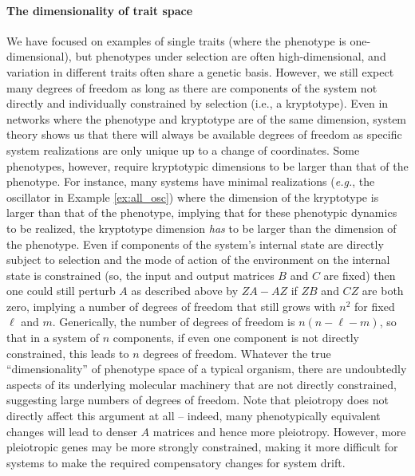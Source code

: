 \documentclass{article}
\newcommand{\1}{\mathbbm{1}}
\begin{document}
\paragraph{The dimensionality of trait space} 
We have focused on examples of single traits (where the phenotype is one-dimensional),
but phenotypes under selection are often high-dimensional,
and variation in different traits often share a genetic basis.
However, we still expect many degrees of freedom
as long as there are components of the system not directly and individually constrained by selection
(i.e., a kryptotype). %
Even in networks where the phenotype and kryptotype are of the same dimension,
system theory shows us that there will always be available degrees of freedom
as specific system realizations are only unique up to a change of coordinates.
Some phenotypes, however, require kryptotypic dimensions to be larger than that of the phenotype.
For instance, many systems have minimal realizations (\emph{e.g.}, the oscillator in Example \ref{ex:all_osc}) where the dimension of the kryptotype is larger
than that of the phenotype, implying that for these phenotypic dynamics to be realized, the kryptotype dimension \emph{has} to be larger than the dimension of the phenotype.
Even if components of the system's internal state are directly subject to selection
and the mode of action of the environment on the internal state is constrained
(so, the input and output matrices $B$ and $C$ are fixed)
then one could still perturb $A$ as described above by $ZA - AZ$
if $ZB$ and $CZ$ are both zero, implying a number of degrees of freedom that still grows with $n^2$
for fixed $\ell$ and $m$.
Generically, the number of degrees of freedom is $n(n - \ell - m)$,
so that in a system of $n$ components, if even one component is not directly constrained,
this leads to $n$ degrees of freedom.
Whatever the true ``dimensionality'' of phenotype space of a typical organism,
there are undoubtedly aspects of its underlying molecular machinery that are not directly constrained,
suggesting large numbers of degrees of freedom.
Note that pleiotropy does not directly affect this argument at all --
indeed, many phenotypically equivalent changes will lead to denser $A$ matrices and hence more pleiotropy.
However, more pleiotropic genes may be more strongly constrained,
making it more difficult for systems to make the required compensatory changes for system drift.
\end{document}
